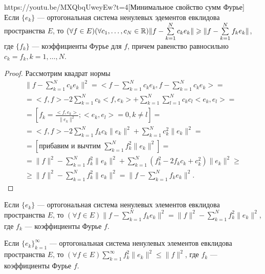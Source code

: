 \begin{linkthm}{https://youtu.be/MXQbqUweyEw?t=4}[Минимальное свойство сумм Фурье]\ \\
	Если $\{e_k\}$ --- ортогональная система ненулевых эдементов евклидова пространства $E$, то $(\forall f\in E)(\forall c_1,\ldots, c_N \in \mathbb{R})\|f-\sum\limits_{k=1}^N c_k e_k\|\geqslant \|f-\sum\limits_{k=1}^N f_ke_k\|$, где $\{f_k\}$ --- коэффициенты Фурье для $f$, причем равенство равносильно $c_k=f_k, k=1,\ldots, N$.
\end{linkthm}
\begin{proof} Рассмотрим квадрат нормы
\begin{multline*}
\|f-\sum\limits_{k=1}^N c_ke_k\|^2=<f-\sum\limits_{k=1}^Nc_ke_k, f-\sum\limits_{k=1}^Nc_ke_k>=\\=<f,f>-2\sum\limits_{k=1}^Nc_k<f,e_k>+\sum\limits_{k=1}^N\sum\limits_{l=1}^N c_kc_l<e_k,e_l>=\\=\left[f_k=\frac{<f,e_k>}{\|e_k\|^2}; <e_k,e_l>=0, k\ne l\right]=\\=<f,f>-2\sum\limits_{k=1}^Nf_kc_k\|e_k\|^2+\sum\limits_{k=1}^Nc_k^2\|e_k\|^2=\\=\left[\text{прибавим и вычтим } \sum\limits_{k=1}^Nf_k^2\|e_k\|^2\right]=\\=\|f\|^2-\sum\limits_{k=1}^Nf_k^2\|e_k\|^2+\sum\limits_{k=1}^N(f_k^2-2f_kc_k+c_k^2)\|e_k\|^2\geqslant \\ \geqslant \|f\|^2-\sum\limits_{k=1}^Nf_k^2\|e_k\|^2=\|f-\sum\limits_{k=1}^Nf_ke_k\|^2.
\end{multline*}
\end{proof}

\begin{corollary}
	Если $\{e_k\}$ --- ортогональная система ненулевых элементов евклидова  пространства $E$, то $(\forall f\in E) \|f-\sum\limits_{k=1}^N f_ke_k\|^2=\|f\|^2-\sum\limits_{k=1}^N f_k^2\|e_k\|^2$, где $f_k$ --- коэффициенты Фурье $f$.
\end{corollary}

\begin{corollary}
	Если $\{e_k\}_{k=1}^\infty$ --- ортогональная система ненулевых элементов евклидова  пространства $E$, то $(\forall f\in E) \sum\limits_{k=1}^\infty f_k^2\|e_k\|^2\leqslant \|f\|^2$, где $f_k$ --- коэффициенты Фурье $f$.
\end{corollary}

